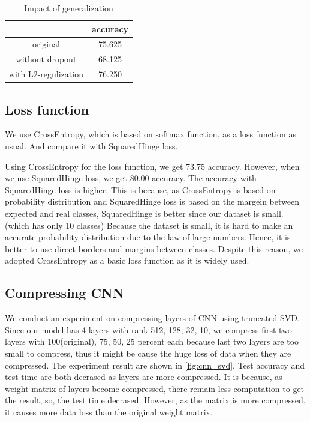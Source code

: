 \begin{table}[htbp]
	\centering
	\setlength{\tabcolsep}{10pt}
	\renewcommand{\arraystretch}{1.5}
	\caption{Impact of generalization}
	\label{table:generalization}
	\begin{tabular}{|c||c|}
	\hline
	& accuracy  \\ \hline\hline
	original & 75.625  \\ \hline
	without dropout & 68.125  \\ \hline
	with L2-regulization & 76.250  \\ \hline
	\end{tabular}
\end{table}
	

\subsection{Loss function}
We use CrossEntropy, which is based on softmax function, as a loss function as usual. And compare it with SquaredHinge loss.

Using CrossEntropy for the loss function, we get 73.75 accuracy. However, when we use SquaredHinge loss, we get 80.00 accuracy. The accuracy with SquaredHinge loss is higher. This is because, as CrossEntropy is based on probability distribution and SquaredHinge loss is based on the margein between expected and real classes, SquaredHinge is better since our dataset is small. (which has only 10 classes) Because the dataset is small, it is hard to make an accurate probability distribution due to the law of large numbers. Hence, it is better to use direct borders and margins between classes.
Despite this reason, we adopted CrossEntropy as a basic loss function as it is widely used.

\subsection{Compressing CNN}
We conduct an experiment on compressing layers of CNN using truncated SVD. Since our model has 4 layers with rank 512, 128, 32, 10, we compress first two layers with 100(original), 75, 50, 25 percent each because last two layers are too small to compress, thus it might be cause the huge loss of data when they are compressed. The experiment result are shown in \cref{fig:cnn_svd}. Test accuracy and test time are both decrased as layers are more compressed. It is because, as weight matrix of layers become compressed, there remain less computation to get the result, so, the test time decrased. However, as the matrix is more compressed, it causes more data loss than the original weight matrix.

